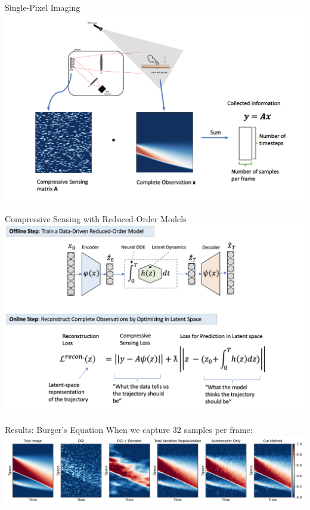 \documentclass[8pt]{beamer}
\begin{document}
\begin{frame}{Single-Pixel Imaging}
	\includegraphics[width=\textwidth]{Figures/spi_math.png}
\end{frame}


\begin{frame}{Compressive Sensing with Reduced-Order Models}
	\includegraphics[width=\textwidth]{Figures/cs_schematics.png}
\end{frame}

\begin{frame}{Results: Burger's Equation}
	When we capture 32 samples per frame:
	\includegraphics[width=\textwidth]{Figures/cs_burgers_comparison_32.pdf}
\end{frame}
\end{document}
